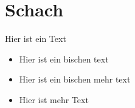\documentclass{article}
\begin{document}
\section{Schach}
Hier ist ein Text
\begin{itemize}
\item Hier ist ein bischen text
\item Hier ist ein bischen mehr text
\end{itemize}
\begin{itemize}
\item Hier ist mehr Text
\end{itemize}
\end{document}
